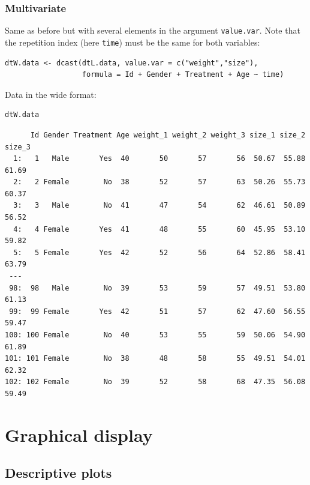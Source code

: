 \documentclass{article}
\begin{document}
\clearpage

\subsubsection{Multivariate}
\label{sec:org670c9e7}


Same as before but with several elements in the argument
\texttt{value.var}. Note that the repetition index (here \texttt{time}) must be the
same for both variables:
\lstset{language=r,label= ,caption= ,captionpos=b,numbers=none}
\begin{lstlisting}
dtW.data <- dcast(dtL.data, value.var = c("weight","size"),
                  formula = Id + Gender + Treatment + Age ~ time)
\end{lstlisting}

Data in the wide format:
\lstset{language=r,label= ,caption= ,captionpos=b,numbers=none}
\begin{lstlisting}
dtW.data
\end{lstlisting}

\begin{verbatim}
      Id Gender Treatment Age weight_1 weight_2 weight_3 size_1 size_2 size_3
  1:   1   Male       Yes  40       50       57       56  50.67  55.88  61.69
  2:   2 Female        No  38       52       57       63  50.26  55.73  60.37
  3:   3   Male        No  41       47       54       62  46.61  50.89  56.52
  4:   4 Female       Yes  41       48       55       60  45.95  53.10  59.82
  5:   5 Female       Yes  42       52       56       64  52.86  58.41  63.79
 ---                                                                         
 98:  98   Male        No  39       53       59       57  49.51  53.80  61.13
 99:  99 Female       Yes  42       51       57       62  47.60  56.55  59.47
100: 100 Female        No  40       53       55       59  50.06  54.90  61.89
101: 101 Female        No  38       48       58       55  49.51  54.01  62.32
102: 102 Female        No  39       52       58       68  47.35  56.08  59.49
\end{verbatim}

\section{Graphical display}
\label{sec:org02b000d}
\subsection{Descriptive plots}
\label{sec:orgf5e51f6}
\end{document}
